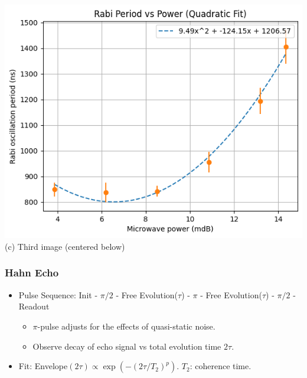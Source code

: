 \documentclass{beamer}
\begin{document}
\begin{frame}{}
    \vspace{1em} %

    \begin{minipage}{0.5\textwidth}
        \centering
        \includegraphics[width=\linewidth]{presentation/figs/period_vs_power.png} \\
        {\small (c) Third image (centered below)}
    \end{minipage}
\end{frame}
\begin{frame}
\frametitle{Hahn Echo}
\begin{itemize}
    \item Pulse Sequence: Init - $\pi/2$ - Free Evolution($\tau$) - $\pi$ - Free Evolution($\tau$) - $\pi/2$ - Readout
    \begin{itemize}
        \item $\pi$-pulse adjusts for the effects of quasi-static noise. 
        \item Observe decay of echo signal vs total evolution time $2\tau$.
    \end{itemize}
    \item Fit: Envelope$(2\tau) \propto \exp(-(2\tau/T_2)^p)$. $T_2$: coherence time. 
\end{itemize}

\end{frame}
\end{document}
